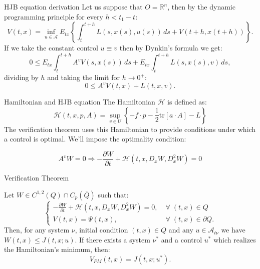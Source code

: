 \documentclass[10pt, compress]{beamer}
\newcommand{\R}{\mathbb{R}}
\let\oldforall\forall
\renewcommand{\forall}{\; \oldforall \;}
\begin{document}
\begin{frame}{HJB equation derivation}
    Let us suppose that $O=\R^n$, then by the dynamic programming principle for every $h<t_1-t$:
    \[V(t,x) = \inf_{u\in\mathcal{A}}E_{tx}\left\{\int_t^{t+h} L(s,x(s),u(s))\,ds + V(t+h,x(t+h))\right\}.\]
    If we take the constant control $u\equiv v$ then by Dynkin's formula we get:
    \[
        0 \leq E_{tx}\int_t^{t+h} A^vV(s,x(s))\,ds + E_{tx}\int_t^{t+h} L(s,x(s),v)\,ds,
    \]
    dividing by $h$ and taking the limit for $h\to0^+$:
    \[0 \leq A^vV(t,x) + L(t,x,v).\]
\end{frame}

\begin{frame}{Hamiltonian and HJB equation}
    The Hamiltonian $\mathcal{H}$ is defined as:
    \[\mathcal{H}(t,x,p,A) = \sup_{v\in U}\left\{-f\cdot p - \frac{1}{2}\text{tr}\left[a\cdot A\right] - L\right\}\]
    The verification theorem uses this Hamiltonian to provide conditions under which a control is optimal. We'll impose the optimality condition:

    \[A^vW = 0 \Rightarrow -\frac{\partial W}{\partial t} + \mathcal{H}(t,x,D_xW,D_x^2W) = 0\]
\end{frame}

\begin{frame}{Verification Theorem}
    \begin{theorem}
    Let $W\in C^{1,2}(Q)\cap C_p(\overline{Q})$ such that:
    \begin{equation}\label{systverstoch}\begin{cases}
        -\frac{\partial W}{\partial t} + \mathcal{H}(t,x,D_xW,D_x^2W) = 0, & \forall(t,x)\in Q \\
        V(t,x) = \Psi(t,x), & \forall(t,x)\in\partial Q.
    \end{cases}\end{equation}
    Then, for any system $\nu$, initial condition $(t,x)\in Q$ and any $u\in \mathcal{A}_{t\nu}$ we have $W(t,x)\leq J(t,x;u)$. If there exists a system $\nu^{\ast}$ and a control $u^{\ast}$ which realizes the Hamiltonian's minimum, then:
        \begin{equation}
            V_{PM}(t,x) = J(t,x;u^{\ast}).
        \end{equation}
    \end{theorem}
\end{frame}
\end{document}
